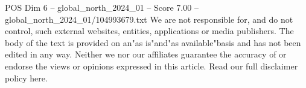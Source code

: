 \begin{textsample}{POS Dim 6 – global\_north\_2024\_01 – Score 7.00 – global\_north\_2024\_01/104993679.txt}
We are not responsible for, and do not control, such external websites, entities, applications or media publishers.
The body of the text is provided on an"as is"and"as available"basis and has not been edited in any way.
Neither we nor our affiliates guarantee the accuracy of or endorse the views or opinions expressed in this article.
Read our full disclaimer policy here.

\end{textsample}
